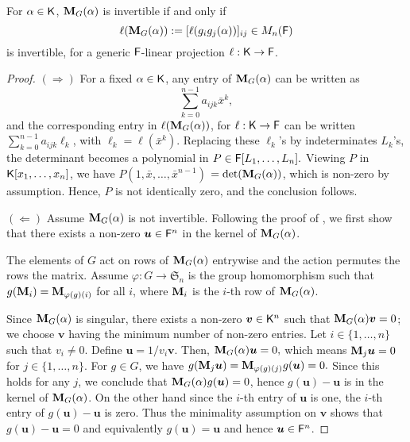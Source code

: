 \begin{lemma}
  \label{Lem:Proj}
  For $\alpha \in {\mathsf{K}}$, $\mat M_G(\alpha)$ is invertible if and only
  if $$\ell(\mat M_G(\alpha)) := [\ell(g_ig_j(\alpha))]_{ij} \in M_n(\F)$$
  is invertible, for a generic ${\mathsf{F}}$-linear projection $\ell: {\mathsf{K}} \to {\mathsf{F}}$.
\end{lemma}
\begin{proof}
  $(\Rightarrow)$ For a fixed $\alpha\in{\mathsf{K}}$, any entry of
  $\mat M_G(\alpha)$ can be written as
  \begin{equation}\label{Eq:PrimElm}
    \sum_{k= 0}^{n-1} a_{ijk}\bar x^k,
  \end{equation}
  and the corresponding entry in $\ell(\mat M_G(\alpha))$, for
  $\ell: {\mathsf{K}} \to {\mathsf{F}}$ can be written $\sum_{k= 0}^{n-1} a_{ijk}\ell_k$, with
  $\ell_k = \ell(\bar x^k)$. Replacing these $\ell_k$'s by indeterminates
  $L_k$'s, the determinant becomes a polynomial in
  $P \in {\mathsf{F}}[L_1, \ldots, L_n].$ Viewing $P$ in ${\mathsf{K}}[x_1, \ldots , x_n]$, we
  have $ P(1, \bar x, \ldots, \bar x^{n-1})$ $= \det(\mat M_G(\alpha))$,
  which is non-zero by assumption. Hence, $P$ is not identically zero, and
  the conclusion follows.
  
  $(\Leftarrow)$ Assume $\mat M_G(\alpha)$ is not invertible. Following the
  proof of \cite[Lemma 4]{Jam18}, we first show that there exists a
  non-zero $\boldsymbol{u} \in {\mathsf{F}}^n$ in the kernel of $\mat M_G(\alpha)$.
  
  The elements of $G$ act on rows of $\mat M_G(\alpha)$ entrywise and the
  action permutes the rows the matrix. Assume
  $\varphi : G \to \mathfrak{S}_n$ is the group homomorphism such that
  $g(\mat M_i) = \mat M_{\varphi(g)(i)}$ for all $i$, where $\mat M_i$ is
  the $i$-th row of $\mat M_G(\alpha)$.
  
  Since $\mat M_G(\alpha)$ is singular, there exists a non-zero
  $\boldsymbol{v} \in {\mathsf{K}}^n$ such that $\mat M_G(\alpha)\boldsymbol{v} = 0$;
  we choose $\boldsymbol{v}$ having the minimum number of non-zero
  entries. Let $i \in \lbrace 1, \ldots , n \rbrace$ such that
  $v_i \neq 0$. Define $\boldsymbol{u} = 1/v_i\boldsymbol{v}$. Then,
  $\mat M_G(\alpha)\boldsymbol{u} = 0,$ which means
  $\mat M_j \boldsymbol{u} = 0 $ for $j \in \lbrace 1, \ldots, n
  \rbrace$. For $g \in G$, we have
  $g(\mat M_j \boldsymbol{u}) = \mat M_{\varphi(g)(j)} g(\boldsymbol{u})=
  0.$ Since this holds for any $j$, we conclude that
  $\mat M_G(\alpha)g(\boldsymbol{u})= 0$, hence
  $g(\boldsymbol{u})-\boldsymbol{u}$ is in the kernel of
  $\mat M_G(\alpha)$. On the other hand since the $i$-th entry of
  $\boldsymbol{u}$ is one, the $i$-th entry of
  $g(\boldsymbol{u}) -\boldsymbol{u}$ is zero. Thus the minimality
  assumption on $\textbf{v}$ shows that
  $g(\boldsymbol{u}) -\boldsymbol{u} = 0$ and equivalently
  $g(\boldsymbol{u})=\boldsymbol{u}$ and hence $\boldsymbol{u} \in {\mathsf{F}}^n$.
  

\end{proof}
